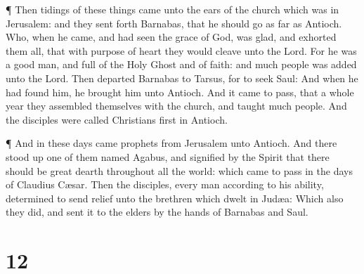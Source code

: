  ¶ Then tidings of these things came unto the ears of the
church which was in Jerusalem: and they sent forth Barnabas, that he
should go as far as Antioch.  Who, when he came, and had
seen the grace of God, was glad, and exhorted them all, that with
purpose of heart they would cleave unto the Lord.  For he
was a good man, and full of the Holy Ghost and of faith: and much people
was added unto the Lord.  Then departed Barnabas to Tarsus,
for to seek Saul:  And when he had found him, he brought
him unto Antioch. And it came to pass, that a whole year they assembled
themselves with the church, and taught much people. And the disciples
were called Christians first in Antioch.

 ¶ And in these days came prophets from Jerusalem unto
Antioch.  And there stood up one of them named Agabus, and
signified by the Spirit that there should be great dearth throughout all
the world: which came to pass in the days of Claudius Cæsar.
 Then the disciples, every man according to his ability,
determined to send relief unto the brethren which dwelt in Judæa:
 Which also they did, and sent it to the elders by the
hands of Barnabas and Saul.

\hypertarget{section-11}{%
\section{12}\label{section-11}}


